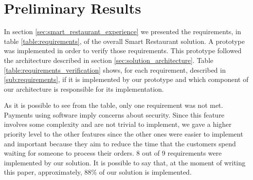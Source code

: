 
\section{Preliminary Results}
\label{sec:preliminary_results}
In section \ref{sec:smart_restaurant_experience} we presented the
requirements, in table \ref{table:requirements}, of the overall
Smart Restaurant solution.
A prototype was implemented in order to verify those requirements.
This prototype followed the architecture described in section
\ref{sec:solution_architecture}.
Table \ref{table:requirements_verification} shows, for each requirement,
described in \ref{sub:requirements}, if it is implemented by our prototype
and which component of our architecture is responsible for its implementation.



As it is possible to see from the table, only one requirement was not met.
Payments using software imply concerns about security. Since this feature
involves some complexity and are not trivial to implement, we gave
a higher priority level to the other features since the other ones were
easier to implement and important because they aim to reduce the time
that the customers spend waiting for someone to process their orders.
8 out of 9 requirements were implemented by our solution. It is possible to say
that, at the moment of writing this paper, approximately, 88\% of our solution
is implemented.
